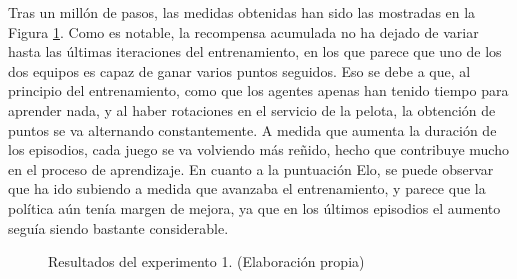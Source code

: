 Tras un millón de pasos, las medidas obtenidas han sido las mostradas en la Figura \ref{fig:exp1-plots}. Como es notable, la recompensa acumulada no ha dejado de variar hasta las últimas iteraciones del entrenamiento, en los que parece que uno de los dos equipos es capaz de ganar varios puntos seguidos. Eso se debe a que, al principio del entrenamiento, como que los agentes apenas han tenido tiempo para aprender nada, y al haber rotaciones en el servicio de la pelota, la obtención de puntos se va alternando constantemente. A medida que aumenta la duración de los episodios, cada juego se va volviendo más reñido, hecho que contribuye mucho en el proceso de aprendizaje. En cuanto a la puntuación Elo, se puede observar que ha ido subiendo a medida que avanzaba el entrenamiento, y parece que la política aún tenía margen de mejora, ya que en los últimos episodios el aumento seguía siendo bastante considerable.
\begin{figure} [H]
 \centering
 \caption[Resultados del experimento 1]{Resultados del experimento 1. (Elaboración propia)}
 \label{fig:exp1-plots}
\end{figure}

